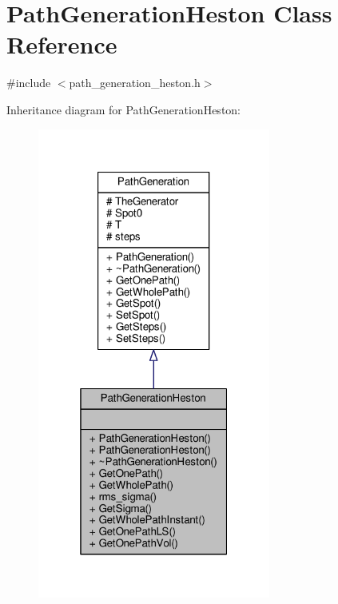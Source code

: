 \hypertarget{classPathGenerationHeston}{}\section{Path\+Generation\+Heston Class Reference}
\label{classPathGenerationHeston}


{\ttfamily \#include $<$path\+\_\+generation\+\_\+heston.\+h$>$}



Inheritance diagram for Path\+Generation\+Heston\+:
\nopagebreak
\begin{figure}[H]
\begin{center}
\leavevmode
\includegraphics[width=217pt]{classPathGenerationHeston__inherit__graph}
\end{center}
\end{figure}


